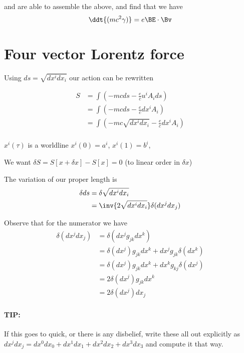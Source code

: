 and are able to assemble the above, and find that we have
\begin{equation}\label{eqn:relativisticElectrodynamicsL10:n}
\ddt{(m c^2 \gamma)} = e \BE \cdot \Bv 
\end{equation}

\section{Four vector Lorentz force}

Using $ds = \sqrt{ dx^i dx_i } $ our action can be rewritten

\begin{align*}
S 
&= \int \left( -m c ds - \frac{e}{c} u^i A_i ds \right) \\
&= \int \left( -m c ds - \frac{e}{c} dx^i A_i \right) \\
&= \int \left( -m c \sqrt{ dx^i dx_i} - \frac{e}{c} dx^i A_i \right) \\
\end{align*}

$x^i(\tau)$ is a worldline $x^i(0) = a^i$, $x^i(1) = b^i$, 

We want $\delta S = S[ x + \delta x ] - S[ x ] = 0$ (to linear order in $\delta x$)

The variation of our proper length is
\begin{align*}
\delta ds 
&=
\delta \sqrt{ dx^i dx_i } \\
&= \inv{ 2 \sqrt{ dx^i dx_i }} \delta (dx^j dx_j)
\end{align*}

Observe that for the numerator we have
\begin{align*}
\delta (dx^j dx_j) 
&= \delta ( dx^j g_{jk} dx^k ) \\
&= \delta ( dx^j ) g_{jk} dx^k + dx^j g_{jk} \delta ( dx^k ) \\
&= \delta ( dx^j ) g_{jk} dx^k + dx^k g_{kj} \delta ( dx^j ) \\
&= 2 \delta ( dx^j ) g_{jk} dx^k \\
&= 2 \delta ( dx^j ) dx_j 
\end{align*}

\paragraph{TIP:} If this goes to quick, or there is any disbelief, write these all out explicitly as $dx^j dx_j = dx^0 dx_0 + dx^1 dx_1 + dx^2 dx_2 + dx^3 dx_3$ and compute it that way.

